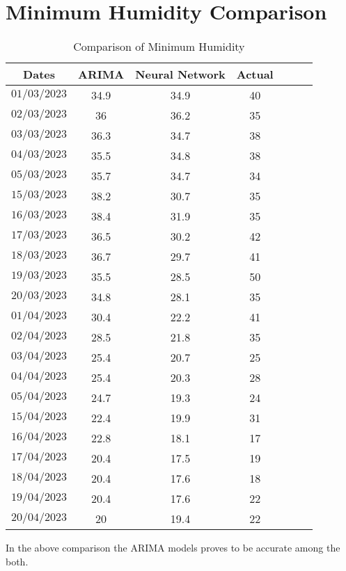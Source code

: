 \section{Minimum Humidity Comparison}
\begin{table}[h]
\centering
\caption{Comparison of Minimum Humidity}
\begin{tabular}{ccccccc}
\toprule
\textbf{Dates} & \textbf{ARIMA} & \textbf{Neural Network} & \textbf{Actual}  \\
\hline
$01/03/2023$ & 34.9 & 34.9 & 40 \\
\hline
$02/03/2023$ & 36 & 36.2 & 35 \\
\hline
$03/03/2023$ & 36.3 & 34.7 & 38 \\
\hline
$04/03/2023$ & 35.5 & 34.8 & 38 \\
\hline
$05/03/2023$ & 35.7 & 34.7 & 34 \\
\hline
$15/03/2023$ & 38.2 & 30.7 & 35 \\
\hline
$16/03/2023$ & 38.4 & 31.9 & 35 \\
\hline
$17/03/2023$ & 36.5 & 30.2 & 42 \\
\hline
$18/03/2023$ & 36.7 & 29.7 & 41 \\
\hline
$19/03/2023$ & 35.5 & 28.5 & 50 \\
\hline
$20/03/2023$ & 34.8 & 28.1 & 35 \\
\hline
$01/04/2023$ & 30.4 & 22.2 & 41 \\
\hline
$02/04/2023$ & 28.5 & 21.8 & 35 \\
\hline
$03/04/2023$ & 25.4 & 20.7 & 25 \\
\hline
$04/04/2023$ & 25.4 & 20.3 & 28 \\
\hline
$05/04/2023$ & 24.7 & 19.3 &24  \\
\hline
$15/04/2023$ & 22.4 & 19.9 & 31 \\
\hline
$16/04/2023$ & 22.8 & 18.1 & 17 \\
\hline
$17/04/2023$ & 20.4 & 17.5 & 19 \\
\hline
$18/04/2023$ & 20.4 & 17.6 & 18 \\
\hline
$19/04/2023$ & 20.4 & 17.6 & 22 \\
\hline
$20/04/2023$ & 20 & 19.4 & 22 \\

\bottomrule
\end{tabular}
\end{table}

In the above comparison the ARIMA models proves to be accurate among the both.
